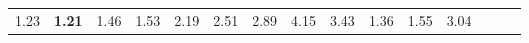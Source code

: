 \begin{tabular}{ll|rrrrrrrrr|rrrr}
  


  
  1.23 & \textbf{1.21} & 1.46 & 1.53 & 2.19 & 2.51 & 2.89 & 4.15 & 3.43 & 1.36 & 1.55 & 3.04 &  \\


\end{tabular}
